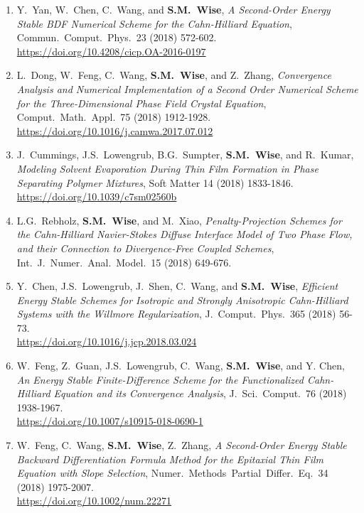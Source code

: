 \documentclass[10pt,letterpaper]{article}
\begin{document}
\begin{enumerate}
	\item
Y.~Yan, W.~Chen, C.~Wang, and \textbf{S.M.~Wise}, {\sl A Second-Order Energy Stable BDF Numerical Scheme for the Cahn-Hilliard Equation}, Commun.~Comput.~Phys.~23 (2018) 572-602.
	\\ 
\url{https://doi.org/10.4208/cicp.OA-2016-0197}


	\item
L.~Dong, W.~Feng, C.~Wang, \textbf{S.M.~Wise}, and Z.~Zhang, {\sl Convergence Analysis and Numerical Implementation of a Second Order Numerical Scheme for the Three-Dimensional Phase Field Crystal Equation}, Comput.~Math.~Appl.~75 (2018) 1912-1928.
	\\ 
\url{https://doi.org/10.1016/j.camwa.2017.07.012}

	\item
J.~Cummings, J.S.~Lowengrub, B.G.~Sumpter, \textbf{S.M.~Wise}, and R.~Kumar, {\sl Modeling Solvent Evaporation During Thin Film Formation in Phase Separating Polymer Mixtures}, Soft Matter 14 (2018) 1833-1846.
	\\ 
\url{https://doi.org/10.1039/c7sm02560b}

	\item
L.G.~Rebholz, \textbf{S.M.~Wise}, and M.~Xiao, {\it Penalty-Projection Schemes for the Cahn-Hilliard Navier-Stokes Diffuse Interface Model of Two Phase Flow, and their Connection to Divergence-Free Coupled Schemes}, Int.~J.~Numer.~Anal.~Model.~15 (2018) 649-676.

	\item
Y.~Chen, J.S.~Lowengrub, J.~Shen, C.~Wang, and \textbf{S.M.~Wise}, {\sl Efficient Energy Stable Schemes for Isotropic and Strongly Anisotropic Cahn-Hilliard Systems with the Willmore Regularization}, J.~Comput.~Phys.~365 (2018) 56-73.
	\\
\url{https://doi.org/10.1016/j.jcp.2018.03.024}

	\item
W.~Feng, Z.~Guan, J.S.~Lowengrub, C.~Wang, \textbf{S.M.~Wise}, and Y. Chen, {\sl An Energy Stable Finite-Difference Scheme for the Functionalized Cahn-Hilliard Equation and its Convergence Analysis}, J.~Sci.~Comput.~76 (2018) 1938-1967.
	\\ 
\url{https://doi.org/10.1007/s10915-018-0690-1}

	\item
W.~Feng, C.~Wang, \textbf{S.M.~Wise}, Z.~Zhang, {\sl A Second-Order Energy Stable Backward Differentiation Formula Method for the Epitaxial Thin Film Equation with Slope Selection}, Numer.~Methods~Partial~Differ.~Eq.~34 (2018) 1975-2007.
	\\ 
\url{https://doi.org/10.1002/num.22271}


\end{enumerate}
\end{document}
